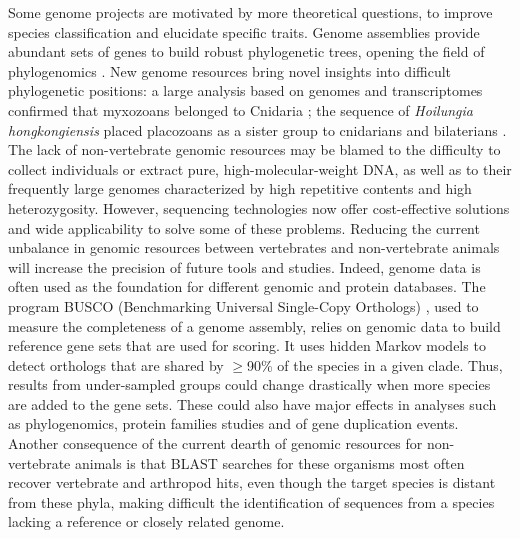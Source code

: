 Some genome projects are motivated by more theoretical questions, to improve species classification and elucidate specific traits. Genome assemblies provide abundant sets of genes to build robust phylogenetic trees, opening the field of phylogenomics \cite{phylogenomics}. New genome resources bring novel insights into difficult phylogenetic positions: a large analysis based on genomes and transcriptomes confirmed that myxozoans belonged to Cnidaria \cite{myxozoa_cnidaria}; the sequence of \textit{Hoilungia hongkongiensis} placed placozoans as a sister group to cnidarians and bilaterians \cite{hoilungia_hongkongiensis}.\\

The lack of non-vertebrate genomic resources may be blamed to the difficulty to collect individuals or extract pure, high-molecular-weight DNA, as well as to their frequently large genomes characterized by high repetitive contents and high heterozygosity. However, sequencing technologies now offer cost-effective solutions and wide applicability to solve some of these problems. Reducing the current unbalance in genomic resources between vertebrates and non-vertebrate animals will increase the precision of future tools and studies. Indeed, genome data is often used as the foundation for different genomic and protein databases. The program BUSCO (Benchmarking Universal Single-Copy Orthologs) \cite{busco_evaluation}, used to measure the completeness of a genome assembly, relies on genomic data to build reference gene sets that are used for scoring. It uses hidden Markov models to detect orthologs that are shared by $\geq$90\% of the species in a given clade. Thus, results from under-sampled groups could change drastically when more species are added to the gene sets. These could also have major effects in analyses such as phylogenomics, protein families studies and of gene duplication events. Another consequence of the current dearth of genomic resources for non-vertebrate animals is that BLAST \cite{blast} searches for these organisms most often recover vertebrate and arthropod hits, even though the target species is distant from these phyla, making difficult the identification of sequences from a species lacking a reference or closely related genome. \\

